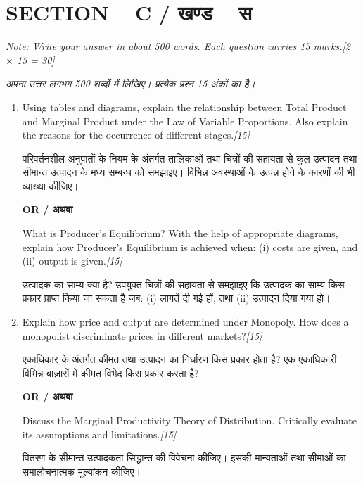 \documentclass[11pt,a4paper]{article}
\newcommand{\pts}[1]{\hfill \textit{[#1]}}
\begin{document}
\bigskip

\section*{SECTION -- C / खण्ड -- स}
\noindent \textit{Note: Write your answer in about 500 words. Each question carries 15 marks.}\pts{2 $\times$ 15 = 30}

\noindent \textit{अपना उत्तर लगभग 500 शब्दों में लिखिए। प्रत्येक प्रश्न 15 अंकों का है।}

\begin{enumerate}[label=\textbf{\arabic*.},leftmargin=*,start=5,itemsep=14pt]

  \item Using tables and diagrams, explain the relationship between Total Product and Marginal Product under the Law of Variable Proportions. Also explain the reasons for the occurrence of different stages.\pts{15}
  
  परिवर्तनशील अनुपातों के नियम के अंतर्गत तालिकाओं तथा चित्रों की सहायता से कुल उत्पादन तथा सीमान्त उत्पादन के मध्य सम्बन्ध को समझाइए। विभिन्न अवस्थाओं के उत्पन्न होने के कारणों की भी व्याख्या कीजिए।

  \begin{center}\textbf{OR / अथवा}\end{center}

  What is Producer's Equilibrium? With the help of appropriate diagrams, explain how Producer's Equilibrium is achieved when:
  (i) costs are given, and (ii) output is given.\pts{15}
  
  उत्पादक का साम्य क्या है? उपयुक्त चित्रों की सहायता से समझाइए कि उत्पादक का साम्य किस प्रकार प्राप्त किया जा सकता है जब:
  (i) लागतें दी गई हों, तथा (ii) उत्पादन दिया गया हो।

  \item Explain how price and output are determined under Monopoly. How does a monopolist discriminate prices in different markets?\pts{15}
  
  एकाधिकार के अंतर्गत कीमत तथा उत्पादन का निर्धारण किस प्रकार होता है? एक एकाधिकारी विभिन्न बाज़ारों में कीमत विभेद किस प्रकार करता है?

  \begin{center}\textbf{OR / अथवा}\end{center}

  Discuss the Marginal Productivity Theory of Distribution. Critically evaluate its assumptions and limitations.\pts{15}
  
  वितरण के सीमान्त उत्पादकता सिद्धान्त की विवेचना कीजिए। इसकी मान्यताओं तथा सीमाओं का समालोचनात्मक मूल्यांकन कीजिए।

\end{enumerate}
\end{document}
